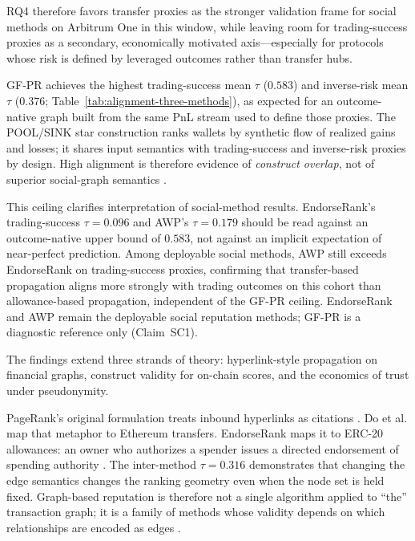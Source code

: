 RQ4 therefore favors transfer proxies as the stronger validation frame for social methods on Arbitrum One in this window, while leaving room for trading-success proxies as a secondary, economically motivated axis---especially for protocols whose risk is defined by leveraged outcomes rather than transfer hubs.


GF-PR achieves the highest trading-success mean $\tau$ ($0.583$) and inverse-risk mean $\tau$ ($0.376$; Table~\ref{tab:alignment-three-methods}), as expected for an outcome-native graph built from the same PnL stream used to define those proxies. The POOL/SINK star construction ranks wallets by synthetic flow of realized gains and losses; it shares input semantics with trading-success and inverse-risk proxies by design. High alignment is therefore evidence of \emph{construct overlap}, not of superior social-graph semantics .

This ceiling clarifies interpretation of social-method results. EndorseRank's trading-success $\tau=0.096$ and AWP's $\tau=0.179$ should be read against an outcome-native upper bound of $0.583$, not against an implicit expectation of near-perfect prediction. Among deployable social methods, AWP still exceeds EndorseRank on trading-success proxies, confirming that transfer-based propagation aligns more strongly with trading outcomes on this cohort than allowance-based propagation, independent of the GF-PR ceiling. EndorseRank and AWP remain the deployable social reputation methods; GF-PR is a diagnostic reference only (Claim~SC1).


The findings extend three strands of theory: hyperlink-style propagation on financial graphs, construct validity for on-chain scores, and the economics of trust under pseudonymity.


PageRank's original formulation treats inbound hyperlinks as citations . Do et al. map that metaphor to Ethereum transfers. EndorseRank maps it to ERC-20 allowances: an owner who authorizes a spender issues a directed endorsement of spending authority . The inter-method $\tau=0.316$ demonstrates that changing the edge semantics changes the ranking geometry even when the node set is held fixed. Graph-based reputation is therefore not a single algorithm applied to ``the'' transaction graph; it is a family of methods whose validity depends on which relationships are encoded as edges .

